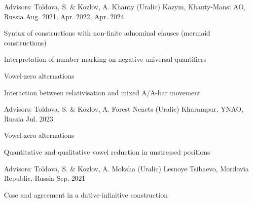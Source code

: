\begin{cventries}

  \cventry
    {Advisors: Toldova, S. \& Kozlov, A.} %
    {Khanty (Uralic)} %
    {Kazym, Khanty-Mansi AO, Russia} %
    {Aug. 2021, Apr. 2022, Apr. 2024} %
    {
      \begin{cvitems} %
        \item {Syntax of constructions with non-finite adnominal clauses (mermaid constructions)}
        \item {Interpretation of number marking on negative universal quantifiers}
        \item {Vowel-zero alternations}
        \item {Interaction between relativisation and mixed A/A-bar movement}
      \end{cvitems}
    }

  \cventry
    {Advisors: Toldova, S. \& Kozlov, A.} %
    {Forest Nenets (Uralic)} %
    {Kharampur, YNAO, Russia} %
    {Jul. 2023} %
    {
      \begin{cvitems} %
        \item {Vowel-zero alternations}
        \item {Quantitative and qualitative vowel reduction in unstressed positions}
      \end{cvitems}
    }

  \cventry
    {Advisors: Toldova, S. \& Kozlov, A.} %
    {Moksha (Uralic)} %
    {Lesnoye Tsibaevo, Mordovia Republic, Russia} %
    {Sep. 2021} %
    {
      \begin{cvitems} %
        \item {Case and agreement in a dative-infinitive construction}
      \end{cvitems}
    }
\end{cventries}



